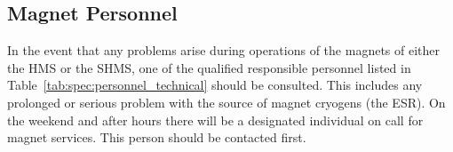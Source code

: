 \subsection {Magnet Personnel}
In the event that any problems arise during operations of the magnets
of either the HMS or the SHMS,
one of the qualified responsible personnel listed in 
Table~\ref{tab:spec:personnel_technical} should be consulted.  This includes any prolonged
or serious problem with the source of magnet cryogens (the ESR).
On the weekend and after hours there
will be a designated individual on call for magnet services. This person should be
contacted first. 


%
%
%
